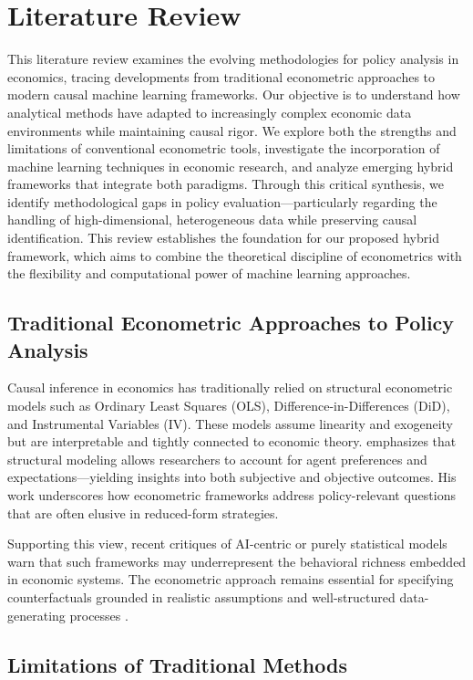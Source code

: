 \section{Literature Review}\label{sec:litreview}
This literature review examines the evolving methodologies for policy analysis in economics, tracing developments from traditional econometric approaches to modern causal machine learning frameworks. Our objective is to understand how analytical methods have adapted to increasingly complex economic data environments while maintaining causal rigor. We explore both the strengths and limitations of conventional econometric tools, investigate the incorporation of machine learning techniques in economic research, and analyze emerging hybrid frameworks that integrate both paradigms. Through this critical synthesis, we identify methodological gaps in policy evaluation—particularly regarding the handling of high-dimensional, heterogeneous data while preserving causal identification. This review establishes the foundation for our proposed hybrid framework, which aims to combine the theoretical discipline of econometrics with the flexibility and computational power of machine learning approaches.
\subsection{Traditional Econometric Approaches to Policy Analysis}\label{subsec:econometric}

Causal inference in economics has traditionally relied on structural econometric models such as Ordinary Least Squares (OLS), Difference-in-Differences (DiD), and Instrumental Variables (IV). These models assume linearity and exogeneity but are interpretable and tightly connected to economic theory. \citet{heckman2008econometric} emphasizes that structural modeling allows researchers to account for agent preferences and expectations—yielding insights into both subjective and objective outcomes. His work underscores how econometric frameworks address policy-relevant questions that are often elusive in reduced-form strategies.

Supporting this view, recent critiques of AI-centric or purely statistical models warn that such frameworks may underrepresent the behavioral richness embedded in economic systems. The econometric approach remains essential for specifying counterfactuals grounded in realistic assumptions and well-structured data-generating processes \citep{econmodel2023}.

\subsection{Limitations of Traditional Methods}\label{subsec:limitations}

